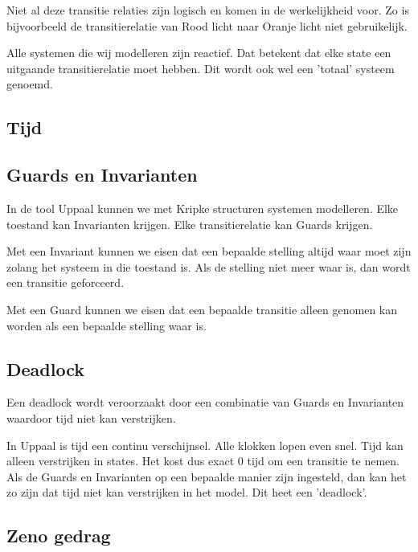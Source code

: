 \documentclass{article}
\begin{document}
		Niet al deze transitie relaties zijn logisch en komen in de werkelijkheid voor. Zo is bijvoorbeeld de transitierelatie van Rood licht naar Oranje licht niet gebruikelijk.
		
		Alle systemen die wij modelleren zijn reactief. Dat betekent dat elke state een uitgaande transitierelatie moet hebben. Dit wordt ook wel een 'totaal' systeem genoemd.
		
		\subsection{Tijd}
		
		
		
		\subsection{Guards en Invarianten}
		
		In de tool Uppaal kunnen we met Kripke structuren systemen modelleren. Elke toestand kan Invarianten krijgen. Elke transitierelatie kan Guards krijgen.
		
		Met een Invariant kunnen we eisen dat een bepaalde stelling altijd waar moet zijn zolang het systeem in die toestand is. Als de stelling niet meer waar is, dan wordt een transitie geforceerd.

		Met een Guard kunnen we eisen dat een bepaalde transitie alleen genomen kan worden als een bepaalde stelling waar is.
		
		\subsection{Deadlock}
		
		Een deadlock wordt veroorzaakt door een combinatie van Guards en Invarianten waardoor tijd niet kan verstrijken.

		In Uppaal is tijd een continu verschijnsel. Alle klokken lopen even snel. Tijd kan alleen verstrijken in states. Het kost dus exact 0 tijd om een transitie te nemen. Als de Guards en Invarianten op een bepaalde manier zijn ingesteld, dan kan het zo zijn dat tijd niet kan verstrijken in het model. Dit heet een 'deadlock'.
		
		\subsection{Zeno gedrag}
		
\end{document}
